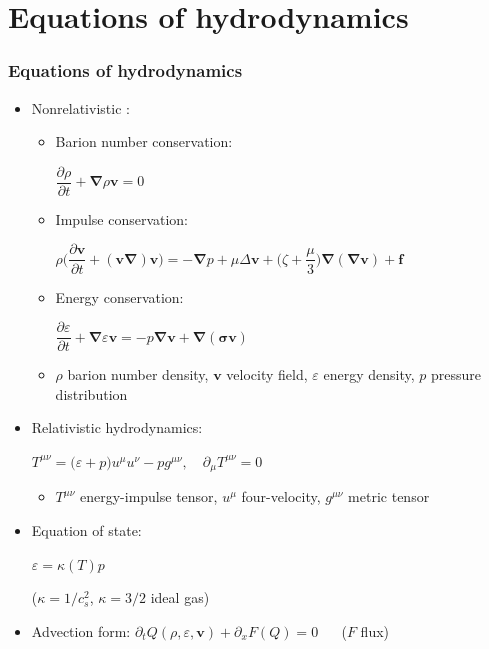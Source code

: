 \documentclass{beamer}
\begin{document}
\section{Equations of hydrodynamics}
\begin{frame}
\frametitle{Equations of hydrodynamics}
\begin{itemize}
\item<1-> Nonrelativistic :
\begin{itemize}
\item<1-> Barion number conservation:\quad \begin{large}$\dfrac{\partial \rho}{\partial t} + \bm{\nabla}\rho\bm{v}=0$\end{large}
\item<1-> Impulse conservation:\quad \begin{center}\begin{large}$\rho\Big(\dfrac{\partial \bm{v}}{\partial t}+(\bm{v\nabla})\bm{v}\Big)=-\bm{\nabla}p +\mu\Delta\bm{v}+\Big(\zeta+\dfrac{\mu}{3}\Big)\bm{\nabla}(\bm{\nabla v})+\bm{f}$\end{large}\end{center}
\item<1-> Energy conservation: \quad\begin{large}$\dfrac{\partial \varepsilon}{\partial t}+\bm{\nabla}\varepsilon\bm{v}=-p\bm{\nabla v}+\bm{\nabla(\sigma v)}$\end{large}
\item<1-> $\rho$ barion number density, $\bm{v}$ velocity field, $\varepsilon$ energy density, $p$ pressure distribution
\end{itemize}

\item<1-> Relativistic hydrodynamics:
\begin{Large}
\begin{center}$T^{\mu\nu}=\big(\varepsilon+p\big)u^\mu u^\nu-pg^{\mu\nu},\quad \partial_\mu T^{\mu\nu}=0$\end{center}
\end{Large}
\begin{itemize}
\item<1-> $T^{\mu\nu}$ energy-impulse tensor, $u^\mu$ four-velocity, $g^{\mu\nu}$ metric tensor
\end{itemize}

\item<1-> Equation of state:\quad \begin{large}$\varepsilon=\kappa(T)p\quad$\end{large} ($\kappa=1/c_s^2$, $\kappa=3/2$ ideal gas)

\item<1-> Advection form: $\partial_t Q(\rho, \varepsilon, \bm{v})+\partial_x F(Q)=0$ $\quad$ ($F$ flux)

\end{itemize}
\end{frame}
\end{document}
